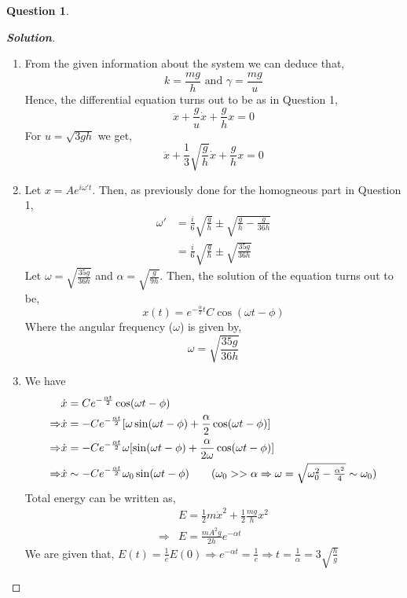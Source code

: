 \documentclass[10pt]{scrartcl}
\theoremstyle{definition}
\newtheorem{exercise}{Question}
\newenvironment{solution} {\begin{proof}[\normalfont \textbf{Solution}]} {\end{proof}}
\begin{document}
\begin{exercise}
    \begin{solution}
        $ $
        \begin{enumerate}[label={(\alph*)}]
            \item From the given information about the system we can deduce that, 
                $$k = \frac{mg}{h} \text{ and } \gamma = \frac{mg}{u}$$
                Hence, the differential equation turns out to be as in Question 1, 
                $$\ddot{x} + \frac{g}{u}\dot{x} + \frac{g}{h} x = 0$$
                For $u = \sqrt{3gh}$ we get,
                $$\ddot{x} + \frac{1}{3}\sqrt{\frac{g}{h}}\dot{x} + \frac{g}{h} x = 0$$
            \item Let $x = Ae^{i\omega' t}$. Then, as previously done for the homogneous part in Question 1, 
                \begin{align*}
                    \omega' &= \frac{i}{6}\sqrt{\frac{g}{h}} \pm \sqrt{\frac{g}{h} - \frac{g}{36h}} \\ 
                            &= \frac{i}{6}\sqrt{\frac{g}{h}} \pm \sqrt{\frac{35g}{36h}}
                \end{align*}
                Let $\omega = \sqrt{\frac{35g}{36h}}$ and $\alpha = \sqrt{\frac{g}{9h}}$. Then, the solution of the equation turns out to be, 
                $$\boxed{x(t) = e^{-\frac{\alpha}{2} t}C\cos (\omega t - \phi)}$$
                Where the angular frequency ($\omega$) is given by, 
                $$\boxed{\omega = \sqrt{\frac{35g}{36h}}}$$
            \item We have 
                \begin{align*}
                    &\dot{x} = Ce^{-\frac{\alpha t}{2}}\cos(\omega t - \phi) \\ 
                    \Rightarrow &\dot{x} = -Ce^{-\frac{\alpha t}{2}}[\omega\sin(\omega t - \phi) + \frac{\alpha}{2}\cos(\omega t - \phi)] \\ 
                    \Rightarrow &\dot{x} = -Ce^{-\frac{\alpha t}{2}}\omega[\sin(\omega t - \phi) + \frac{\alpha}{2\omega}\cos(\omega t - \phi)] \\ 
                    \Rightarrow &\dot{x} \sim -Ce^{-\frac{\alpha t}{2}}\omega_0\sin(\omega t - \phi) \tag{$\omega_0 >> \alpha \Rightarrow \omega = \sqrt{\omega_0^2 - \frac{\alpha^2}{4}} \sim \omega_0$} 
                \end{align*}
                Total energy can be written as, 
                \begin{align*}
                    &E = \frac{1}{2}m\dot{x}^2 + \frac{1}{2}\frac{mg}{h}x^2 \\ 
                    \Rightarrow &E = \frac{mA^2g}{2h}e^{-\alpha t}
                \end{align*}
                We are given that, $E(t) = \frac{1}{e}E(0) \Rightarrow e^{-\alpha t} = \frac{1}{e} \Rightarrow t = \frac{1}{\alpha} = 3\sqrt{\frac{h}{g}}$


\end{enumerate}
\end{solution}
\end{exercise}
\end{document}
